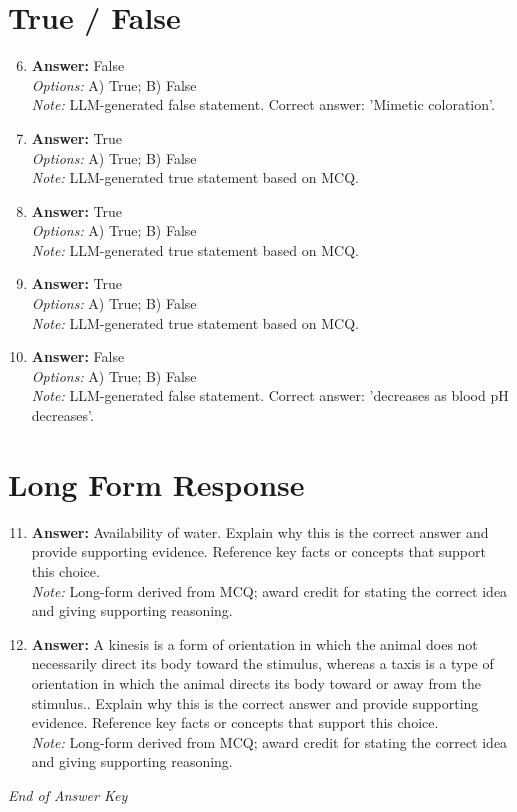 \documentclass[12pt]{article}
\begin{document}
\section*{True / False}
\begin{enumerate}[label=\arabic*.]
\setcounter{enumi}{5}
\item \textbf{Answer:} False
\\ \textit{Options:} A) True; B) False
\\ \textit{Note:} LLM-generated false statement. Correct answer: 'Mimetic coloration'.
\item \textbf{Answer:} True
\\ \textit{Options:} A) True; B) False
\\ \textit{Note:} LLM-generated true statement based on MCQ.
\item \textbf{Answer:} True
\\ \textit{Options:} A) True; B) False
\\ \textit{Note:} LLM-generated true statement based on MCQ.
\item \textbf{Answer:} True
\\ \textit{Options:} A) True; B) False
\\ \textit{Note:} LLM-generated true statement based on MCQ.
\item \textbf{Answer:} False
\\ \textit{Options:} A) True; B) False
\\ \textit{Note:} LLM-generated false statement. Correct answer: 'decreases as blood pH decreases'.
\end{enumerate}

\section*{Long Form Response}
\begin{enumerate}[label=\arabic*.]
\setcounter{enumi}{10}
\item \textbf{Answer:} Availability of water. Explain why this is the correct answer and provide supporting evidence. Reference key facts or concepts that support this choice.
\\ \textit{Note:} Long-form derived from MCQ; award credit for stating the correct idea and giving supporting reasoning.
\item \textbf{Answer:} A kinesis is a form of orientation in which the animal does not necessarily direct its body toward the stimulus, whereas a taxis is a type of orientation in which the animal directs its body toward or away from the stimulus.. Explain why this is the correct answer and provide supporting evidence. Reference key facts or concepts that support this choice.
\\ \textit{Note:} Long-form derived from MCQ; award credit for stating the correct idea and giving supporting reasoning.
\end{enumerate}

\vfill
\noindent\textit{End of Answer Key}
\end{document}

